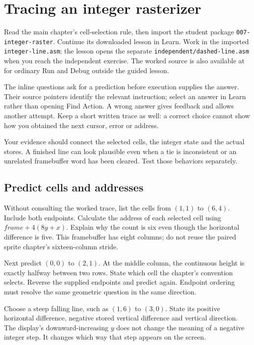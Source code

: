 \chapter{Tracing an integer rasterizer}
\label{revision-lab:integer-algorithms}

Read the main chapter's cell-selection rule, then import the student package
\texttt{007-integer-raster}. Continue its downloaded lesson in Learn. Work in the
imported \texttt{integer-line.asm}; the lesson opens the separate
\texttt{independent/dashed-line.asm} when you reach the independent exercise.
The worked source is also available at
 for ordinary Run and Debug outside
the guided lesson.

The inline questions ask for a prediction before execution supplies the answer.
Their source pointers identify the relevant instruction; select an answer in
Learn rather than opening Find Action. A wrong answer gives feedback and allows
another attempt. Keep a short written trace as well: a correct choice cannot
show how you obtained the next cursor, error or address.

Your evidence should connect the selected cells, the integer state and the actual
stores. A finished line can look plausible even when a tie is inconsistent or an
unrelated framebuffer word has been cleared. Test those behaviors separately.

\section{Predict cells and addresses}

Without consulting the worked trace, list the cells from $(1,1)$ to $(6,4)$.
Include both endpoints. Calculate the address of each selected cell using
$frame+4(8y+x)$. Explain why the count is six even though the horizontal difference
is five. This framebuffer has eight columns; do not reuse the paired sprite
chapter's sixteen-column stride.

Next predict $(0,0)$ to $(2,1)$. At the middle column, the continuous height is
exactly halfway between two rows. State which cell the chapter's convention
selects. Reverse the supplied endpoints and predict again. Endpoint ordering
must resolve the same geometric question in the same direction.

Choose a steep falling line, such as $(1,6)$ to $(3,0)$. State its positive
horizontal difference, negative stored vertical difference and vertical direction.
The display's downward-increasing $y$ does not change the meaning of a negative
integer step. It changes which way that step appears on the screen.

